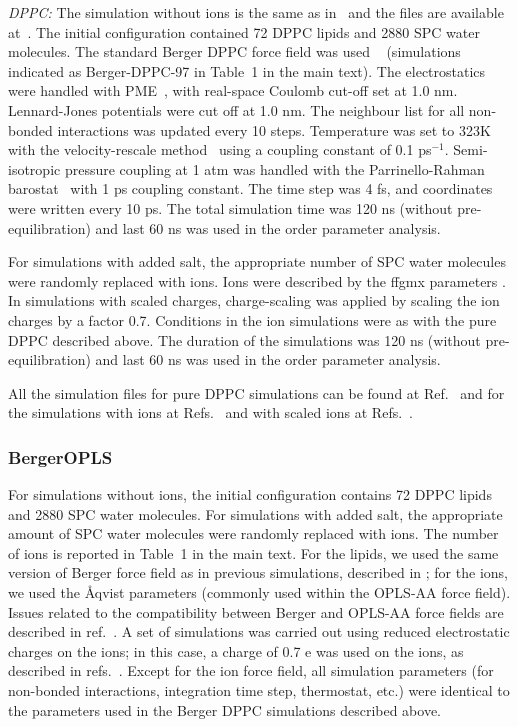 \documentclass[twoside,twocolumn,9pt]{article}
\begin{document}
{\it DPPC:} The simulation without ions is the same as in~\cite{botan15} and the files are available at~\cite{bergerDPPCfiles}.
The initial configuration contained 72 DPPC lipids and 2880 SPC water molecules.
The standard Berger DPPC force field was used ~\cite{berger97} (simulations indicated as Berger-DPPC-97 in Table~1 in the main text). 
The electrostatics were handled with PME~\cite{darden93,essman95}, with real-space Coulomb cut-off set at 1.0 nm. Lennard-Jones potentials were cut off at 1.0 nm. The neighbour list for all non-bonded interactions was updated every 10 steps. 
Temperature was set to 323K with the velocity-rescale method~\cite{bussi07} using a coupling constant of 0.1 ps$^{-1}$.  Semi-isotropic pressure coupling at 1 atm was handled with the Parrinello-Rahman barostat~\cite{parrinello81} with 1 ps coupling constant. The time step was 4 fs, and coordinates were written every 10 ps. The total simulation time was 120 ns (without pre-equilibration) and last 60 ns was used in the order parameter analysis. 

For simulations with added salt, the appropriate number of SPC water molecules were randomly replaced with ions. Ions were described by the ffgmx parameters \cite{straatsma88}. In simulations with scaled charges, charge-scaling was applied by scaling the ion charges  by a factor 0.7. Conditions in the ion simulations were as with the pure DPPC described above. The duration of the simulations was 120 ns (without pre-equilibration) and last 60 ns was used in the order parameter analysis.

All the simulation files for pure DPPC simulations can be found at Ref.~ and for the simulations with ions 
at Refs.~ 
and with scaled ions at Refs.~.



\subsubsection{BergerOPLS}
For simulations without ions, the initial configuration contains 72 DPPC lipids and 2880 SPC water molecules. For simulations with added salt, the appropriate amount of SPC water molecules were randomly replaced with ions. The number of ions is reported in Table~1 in the main text.
For the lipids, we used the same version of Berger force field as in previous simulations, described in \cite{berger97}; for the ions, we used the \r{A}qvist parameters \cite{aqvist90} (commonly used within the OPLS-AA force field). Issues related to the compatibility between Berger and OPLS-AA force fields are described in ref.~\cite{tieleman06}. 
A set of simulations was carried out using reduced electrostatic charges on the ions; in this case, a charge of 0.7 e was used on the ions, as described in refs.~\cite{kohagen16, leontyev11}. Except for the ion force field, all simulation parameters (for non-bonded interactions, integration time step, thermostat, etc.) were identical to the parameters used in the Berger DPPC simulations described above.
\end{document}
